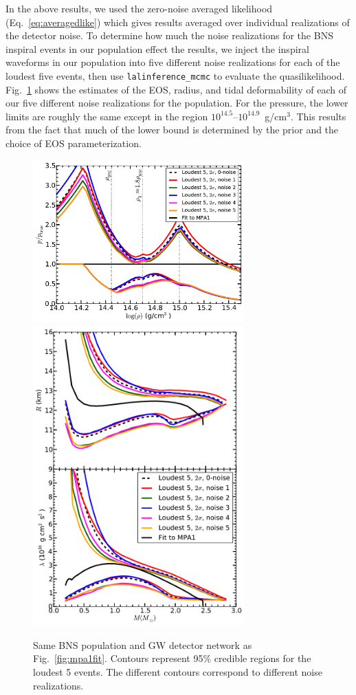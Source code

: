 \documentclass[twocolumn,prd,amssymb,aps,nofootinbib,showpacs,epsf]{revtex4}
\begin{document}
In the above results, we used the zero-noise averaged likelihood (Eq.~\eqref{eq:averagedlike}) which gives results averaged over individual realizations of the detector noise. To determine how much the noise realizations for the BNS inspiral events in our population effect the results, we inject the inspiral waveforms in our population into five different noise realizations for each of the loudest five events, then use \texttt{lalinference\_mcmc} to evaluate the quasilikelihood. Fig.~\ref{fig:noise} shows the estimates of the EOS, radius, and tidal deformability of each of our five different noise realizations for the population. For the pressure, the lower limits are roughly the same except in the region $10^{14.5}$--$10^{14.9}$~g/cm$^3$. This results from the fact that much of the lower bound is determined by the prior and the choice of EOS parameterization.

\begin{figure}[!htb]
\begin{center}
\includegraphics[width=3.2in]{LALMCMCmpa1FitTaylorF2CompareNoiseperror.pdf}\\
\includegraphics[width=3.2in]{LALMCMCmpa1FitTaylorF2CompareNoiseRadiuslambda.pdf}\caption{Same BNS population and GW detector network as Fig.~\ref{fig:mpa1fit}. Contours represent 95\% credible regions for the loudest 5 events. The different contours correspond to different noise realizations.}
\label{fig:noise}
\end{center}
\end{figure}
\end{document}
